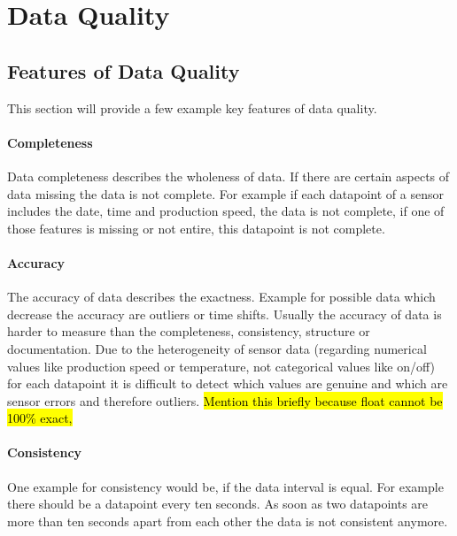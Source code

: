 \chapter{Data Quality}\label{chapter:data-quality}

\section{Features of Data Quality}\label{section:data-quality-features}
This section will provide a few example key features of data quality. 
\subsubsection{Completeness}
Data completeness describes the wholeness of data. If there are certain aspects of data missing the data is not complete. For example if each datapoint of a sensor includes the date, time and production speed, the data is not complete, if one of those features is missing or not entire, this datapoint is not complete. \cite{caiChallengesDataQuality2015, songIoTDataQuality2020}
\subsubsection{Accuracy}
The accuracy of data describes the exactness. Example for possible data which decrease the accuracy are outliers or time shifts. Usually the accuracy of data is harder to measure than the completeness, consistency, structure or documentation. Due to the heterogeneity of sensor data (regarding numerical values like production speed or temperature, not categorical values like on/off) for each datapoint it is difficult to detect which values are genuine and which are sensor errors and therefore outliers. \cite{caiChallengesDataQuality2015}
\hl{Mention this briefly because float cannot be 100\% exact, }

\subsubsection{Consistency}
One example for consistency would be, if the data interval is equal. For example there should be a datapoint every ten seconds. As soon as two datapoints are more than ten seconds apart from each other the data is not consistent anymore. \cite{caiChallengesDataQuality2015}
